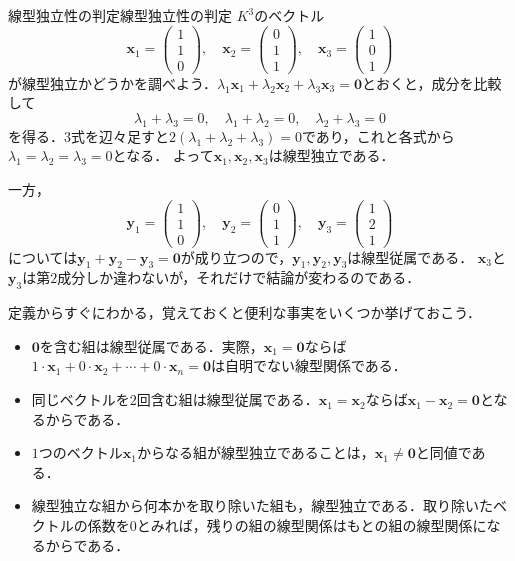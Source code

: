 \begin{example}{線型独立性の判定}{線型独立性の判定}
  $K^3$のベクトル
  \[
    \bm{x}_1 = \begin{pmatrix} 1 \\ 1 \\ 0 \end{pmatrix}, \quad
    \bm{x}_2 = \begin{pmatrix} 0 \\ 1 \\ 1 \end{pmatrix}, \quad
    \bm{x}_3 = \begin{pmatrix} 1 \\ 0 \\ 1 \end{pmatrix}
  \]
  が線型独立かどうかを調べよう．$\lambda_1 \bm{x}_1 + \lambda_2 \bm{x}_2 + \lambda_3 \bm{x}_3 = \bm{0}$とおくと，成分を比較して
  \[
    \lambda_1 + \lambda_3 = 0, \quad
    \lambda_1 + \lambda_2 = 0, \quad
    \lambda_2 + \lambda_3 = 0
  \]
  を得る．$3$式を辺々足すと$2(\lambda_1 + \lambda_2 + \lambda_3) = 0$であり，これと各式から$\lambda_1 = \lambda_2 = \lambda_3 = 0$となる．
  よって$\bm{x}_1, \bm{x}_2, \bm{x}_3$は線型独立である．

  一方，
  \[
    \bm{y}_1 = \begin{pmatrix} 1 \\ 1 \\ 0 \end{pmatrix}, \quad
    \bm{y}_2 = \begin{pmatrix} 0 \\ 1 \\ 1 \end{pmatrix}, \quad
    \bm{y}_3 = \begin{pmatrix} 1 \\ 2 \\ 1 \end{pmatrix}
  \]
  については$\bm{y}_1 + \bm{y}_2 - \bm{y}_3 = \bm{0}$が成り立つので，$\bm{y}_1, \bm{y}_2, \bm{y}_3$は線型従属である．
  $\bm{x}_3$と$\bm{y}_3$は第$2$成分しか違わないが，それだけで結論が変わるのである．
\end{example}

定義からすぐにわかる，覚えておくと便利な事実をいくつか挙げておこう．
\begin{itemize}[leftmargin=2em]
  \item $\bm{0}$を含む組は線型従属である．実際，$\bm{x}_1 = \bm{0}$ならば$1 \cdot \bm{x}_1 + 0 \cdot \bm{x}_2 + \cdots + 0 \cdot \bm{x}_n = \bm{0}$は自明でない線型関係である．
  \item 同じベクトルを$2$回含む組は線型従属である．$\bm{x}_1 = \bm{x}_2$ならば$\bm{x}_1 - \bm{x}_2 = \bm{0}$となるからである．
  \item $1$つのベクトル$\bm{x}_1$からなる組が線型独立であることは，$\bm{x}_1 \ne \bm{0}$と同値である．
  \item 線型独立な組から何本かを取り除いた組も，線型独立である．取り除いたベクトルの係数を$0$とみれば，残りの組の線型関係はもとの組の線型関係になるからである．
\end{itemize}

